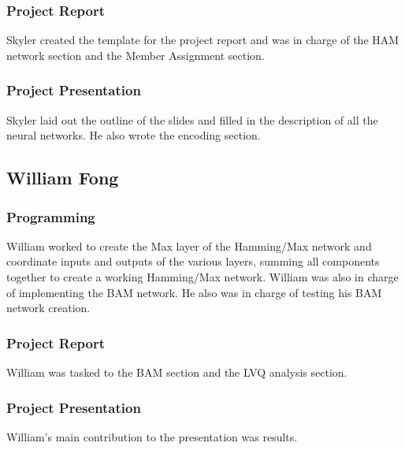 \documentclass{article}
\begin{document}
\subsubsection{Project Report}
Skyler created the template for the project report and was in charge of the HAM 
network section and the Member Assignment section.

\subsubsection{Project Presentation}
Skyler laid out the outline of the slides and filled in the description of all the neural networks. He also wrote the encoding section.

\subsection{William Fong}
\subsubsection{Programming}
William worked to create the Max layer of the Hamming/Max network and coordinate 
inputs and outputs of the various layers, summing all components together to create a working Hamming/Max network. William was also in charge of implementing the BAM network. He also was in charge of testing his BAM network creation.
\subsubsection{Project Report}
William was tasked to the BAM section and the LVQ analysis section.

\subsubsection{Project Presentation}
William's main contribution to the presentation was results.
\end{document}

